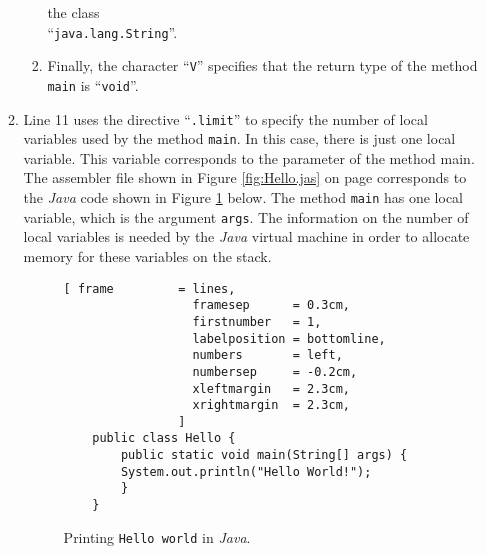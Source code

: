 \begin{enumerate}
\begin{enumerate}
\begin{enumerate}
              the class \\
              ``\texttt{java.lang.String}''.
        \item Finally, the character ``\texttt{V}'' specifies that the return type of the method \texttt{main}
              is ``\texttt{void}''.
       \end{enumerate}
  \item Line 11 uses the directive ``\texttt{.limit}'' to specify the number of local variables 
        used by the method \texttt{main}.  In this case, there is just one local variable.  This variable
        corresponds to the parameter of the method main.  The assembler file shown in Figure
        \ref{fig:Hello.jas} on page \pageref{fig:Hello.jas} corresponds to the \textsl{Java} code
        shown in Figure \ref{fig:Hello.java} below.  The method \texttt{main} has one local
        variable, which is the argument \texttt{args}.
        The information on the number of local variables is needed by the \textsl{Java} virtual
        machine in order to allocate memory for these variables on the stack.

\begin{figure}[!ht]
\centering
\begin{Verbatim}[ frame         = lines, 
                  framesep      = 0.3cm, 
                  firstnumber   = 1,
                  labelposition = bottomline,
                  numbers       = left,
                  numbersep     = -0.2cm,
                  xleftmargin   = 2.3cm,
                  xrightmargin  = 2.3cm,
                ]
    public class Hello {
        public static void main(String[] args) {
    	System.out.println("Hello World!");
        }
    }
\end{Verbatim}
\vspace*{-0.3cm}
\caption{Printing \texttt{Hello world} in \textsl{Java}.} 
\label{fig:Hello.java}
\end{figure}


\end{enumerate}
\end{enumerate}
